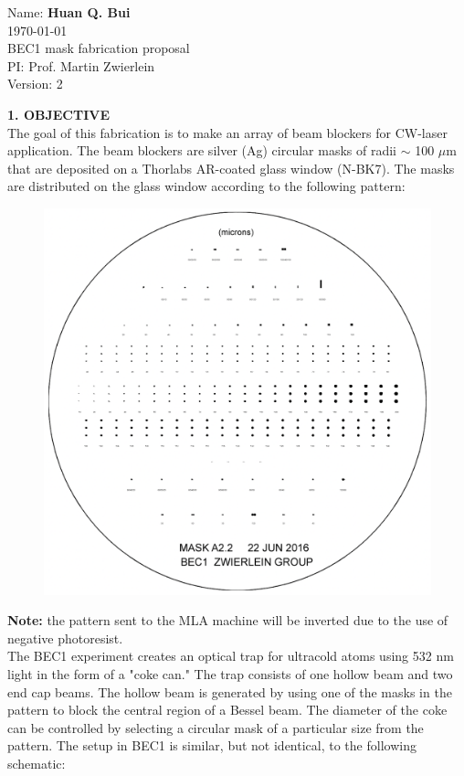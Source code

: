 \documentclass{article}
\theoremstyle{definition}
\begin{document}
\begin{framed}
\noindent Name: \textbf{Huan Q. Bui}\\
\today \\
BEC1 mask fabrication proposal \\
PI: Prof. Martin Zwierlein\\
Version: 2
\end{framed}


\noindent \textbf{1. OBJECTIVE}\\

\noindent The goal of this fabrication is to make an array of beam blockers for CW-laser application. The beam blockers are silver (Ag) circular masks of radii $\sim$ 100 $\mu$m that are deposited on a Thorlabs AR-coated glass window (N-BK7). The masks are distributed on the glass window according to the following pattern:

\begin{figure}[!htb]
\centering
\includegraphics[scale=0.35]{masks.png}
\end{figure}

\noindent \textbf{Note:} the pattern sent to the MLA machine will be inverted due to the use of negative photoresist.\\

\noindent The BEC1 experiment creates an optical trap for ultracold atoms using 532 nm light in the form of a "coke can." The trap consists of one hollow beam and two end cap beams. The hollow beam is generated by using one of the masks in the pattern to block the central region of a Bessel beam. The diameter of the coke can be controlled by selecting a circular mask of a particular size from the pattern. The setup in BEC1 is similar, but not identical, to the following schematic:
\end{document}
